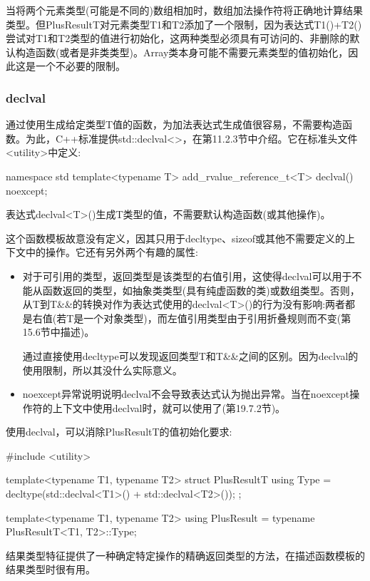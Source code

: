当将两个元素类型(可能是不同的)数组相加时，数组加法操作符将正确地计算结果类型。但PlusResultT对元素类型T1和T2添加了一个限制，因为表达式T1()+T2()尝试对T1和T2类型的值进行初始化，这两种类型必须具有可访问的、非删除的默认构造函数(或者是非类类型)。Array类本身可能不需要元素类型的值初始化，因此这是一个不必要的限制。

\subsubsection{declval}

通过使用生成给定类型T值的函数，为加法表达式生成值很容易，不需要构造函数。为此，C++标准提供std::declval<>，在第11.2.3节中介绍。它在标准头文件<utility>中定义:

\begin{cpp}
namespace std {
	template<typename T>
	add_rvalue_reference_t<T> declval() noexcept;
}
\end{cpp}

表达式declval<T>()生成T类型的值，不需要默认构造函数(或其他操作)。

这个函数模板故意没有定义，因其只用于decltype、sizeof或其他不需要定义的上下文中的操作。它还有另外两个有趣的属性:

\begin{itemize}
\item 
对于可引用的类型，返回类型是该类型的右值引用，这使得declval可以用于不能从函数返回的类型，如抽象类类型(具有纯虚函数的类)或数组类型。否则，从T到T\&\&的转换对作为表达式使用的declval<T>()的行为没有影响:两者都是右值(若T是一个对象类型)，而左值引用类型由于引用折叠规则而不变(第15.6节中描述)。

\begin{notice}通过直接使用decltype可以发现返回类型T和T\&\&之间的区别。因为declval的使用限制，所以其没什么实际意义。
\end{notice}

\item 
noexcept异常说明说明declval不会导致表达式认为抛出异常。当在noexcept操作符的上下文中使用declval时，就可以使用了(第19.7.2节)。
\end{itemize}

使用declval，可以消除PlusResultT的值初始化要求:

\begin{cpp}
#include <utility>

template<typename T1, typename T2>
struct PlusResultT {
	using Type = decltype(std::declval<T1>() + std::declval<T2>());
};

template<typename T1, typename T2>
using PlusResult = typename PlusResultT<T1, T2>::Type;
\end{cpp}

结果类型特征提供了一种确定特定操作的精确返回类型的方法，在描述函数模板的结果类型时很有用。




















